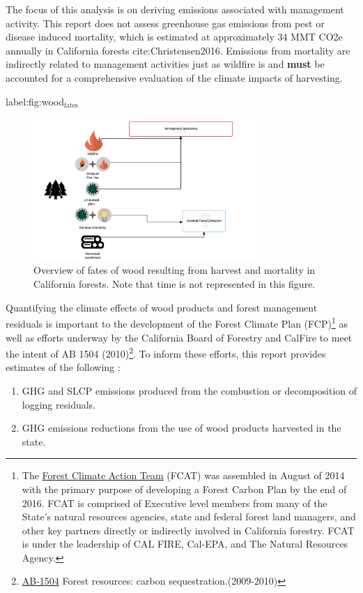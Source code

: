 \documentclass[a4paper]{article}
\begin{document}
The focus of this analysis is on deriving emissions associated with management activity. This report does not assess greenhouse gas emissions from pest or disease induced mortality, which is estimated at approximately 34 MMT CO2e annually in California forests cite:Christensen2016. Emissions from mortality are indirectly related to management activities just as wildfire is and \textbf{must} be accounted for a comprehensive evaluation of the climate impacts of harvesting.    


label:fig:wood$_{\text{fates}}$
\begin{figure}[htb]
\centering
\includegraphics[width=0.75\textwidth]{./graphics/wood_fates.pdf}
\caption{Overview of fates of wood resulting from harvest and mortality in California forests. Note that time is not represented in this figure.}
\end{figure}


Quantifying the climate effects of wood products and forest management
residuals is important to the development of the Forest Climate Plan
(FCP)\footnote{The \href{http://www.fire.ca.gov/fcat/}{Forest Climate Action Team} (FCAT) was assembled in August of 2014 with the primary purpose of developing a Forest Carbon Plan by the end of 2016. FCAT is comprised of Executive level members from many of the State’s natural resources agencies, state and federal forest land managers, and other key partners directly or indirectly involved in California forestry. FCAT is under the leadership of CAL FIRE, Cal-EPA, and The Natural Resources Agency.} as well as efforts underway by the California Board of
Forestry and CalFire to meet the intent of AB 1504 (2010)\footnote{\href{http://leginfo.legislature.ca.gov/faces/billTextClient.xhtml?bill_id=200920100AB1504}{AB-1504} Forest resources: carbon sequestration.(2009-2010)}. To
inform these efforts, this report provides estimates of the following :

\begin{enumerate}
\item GHG and SLCP emissions produced from the combustion or
decomposition of logging residuals.
\item GHG emissions reductions from the use of wood products harvested in
the state.
\end{enumerate}
\end{document}
